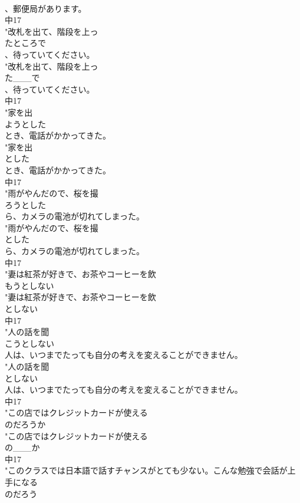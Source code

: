 \documentclass[8pt]{extreport}
\begin{document}
\begin{CJK}{UTF8}{min}
\\	、郵便局があります。
\\	中17
\\	"改札を出て、階段を上っ
\\	たところで
\\	、待っていてください。
\\	"改札を出て、階段を上っ
\\	た___で
\\	、待っていてください。
\\	中17
\\	"家を出
\\	ようとした
\\	とき、電話がかかってきた。
\\	"家を出
\\	とした
\\	とき、電話がかかってきた。
\\	中17
\\	"雨がやんだので、桜を撮
\\	ろうとした
\\	ら、カメラの電池が切れてしまった。
\\	"雨がやんだので、桜を撮
\\	とした
\\	ら、カメラの電池が切れてしまった。
\\	中17
\\	"妻は紅茶が好きで、お茶やコーヒーを飲
\\	もうとしない
\\	"妻は紅茶が好きで、お茶やコーヒーを飲
\\	としない
\\	中17
\\	"人の話を聞
\\	こうとしない
\\	人は、いつまでたっても自分の考えを変えることができません。
\\	"人の話を聞
\\	としない
\\	人は、いつまでたっても自分の考えを変えることができません。
\\	中17
\\	"この店ではクレジットカードが使える
\\	のだろうか
\\	"この店ではクレジットカードが使える
\\	の___か
\\	中17
\\	"このクラスでは日本語で話すチャンスがとても少ない。こんな勉強で会話が上手になる
\\	のだろう

\end{CJK}
\end{document}
